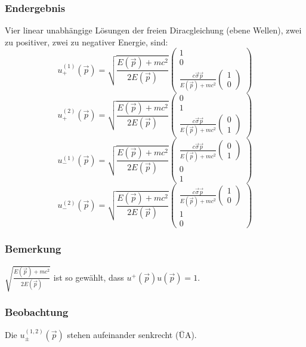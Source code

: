 \documentclass[twoside,a4paper]{scrartcl}
\renewcommand{\1}{\mathds{1}}
\begin{document}
\subsubsection*{Endergebnis}
Vier linear unabhängige Lösungen der freien Diracgleichung (ebene Wellen), zwei zu positiver, zwei zu negativer Energie, sind:
$$u_+^{(1)}(\vec p)=\sqrt{\frac{E(\vec p)+mc^2}{2 E(\vec p)}} \begin{pmatrix}1 \\ 0 \\ \frac{c\vec\sigma\vec p}{E(\vec p)+mc^2} \begin{pmatrix}1 \\ 0\end{pmatrix} \end{pmatrix}$$
$$u_+^{(2)}(\vec p)=\sqrt{\frac{E(\vec p)+mc^2}{2 E(\vec p)}} \begin{pmatrix}0 \\ 1 \\ \frac{c\vec\sigma\vec p}{E(\vec p)+mc^2} \begin{pmatrix}0 \\ 1\end{pmatrix} \end{pmatrix}$$
$$u_-^{(1)}(\vec p)=\sqrt{\frac{E(\vec p)+mc^2}{2 E(\vec p)}} \begin{pmatrix}\frac{c\vec\sigma\vec p}{E(\vec p)+mc^2} \begin{pmatrix}0 \\ 1\end{pmatrix} \\ 0 \\ 1 \end{pmatrix}$$
$$u_-^{(2)}(\vec p)=\sqrt{\frac{E(\vec p)+mc^2}{2 E(\vec p)}} \begin{pmatrix}\frac{c\vec\sigma\vec p}{E(\vec p)+mc^2} \begin{pmatrix}1 \\ 0\end{pmatrix} \\ 1 \\ 0 \end{pmatrix}$$
\subsubsection*{Bemerkung}
$\sqrt{\frac{E(\vec p)+mc^2}{2 E(\vec p)}}$ ist so gewählt, dass $u^+(\vec p)u(\vec p)=1$.
\subsubsection*{Beobachtung}
Die $u_{\pm}^{(1,2)}(\vec p)$ stehen aufeinander senkrecht (ÜA).
% 
\end{document}
